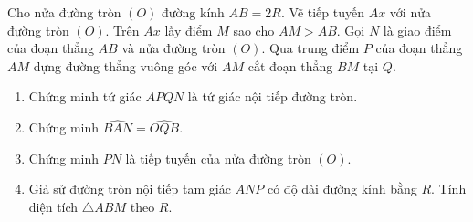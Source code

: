\begin{ex}%
Cho nửa đường tròn $(O)$ đường kính $AB=2R$. Vẽ tiếp tuyến $Ax$ với nửa đường tròn $(O)$. Trên $Ax$ lấy điểm $M$ sao cho $AM>AB$. Gọi $N$ là giao điểm của đoạn thẳng $AB$ và nửa đường tròn $(O)$. Qua trung điểm $P$ của đoạn thẳng $AM$ dựng đường thẳng vuông góc với $AM$ cắt đoạn thẳng $BM$ tại $Q$.
\begin{enumerate}
\item Chứng minh tứ giác $APQN$ là tứ giác nội tiếp đường tròn.
\item Chứng minh $\widehat{BAN}=\widehat{OQB}$.
\item Chứng minh $PN$ là tiếp tuyến của nửa đường tròn $(O)$.
\item Giả sử đường tròn nội tiếp tam giác $ANP$ có độ dài đường kính bằng $R$. Tính diện tích $\triangle ABM$ theo $R$.
\end{enumerate}
\end{ex}
